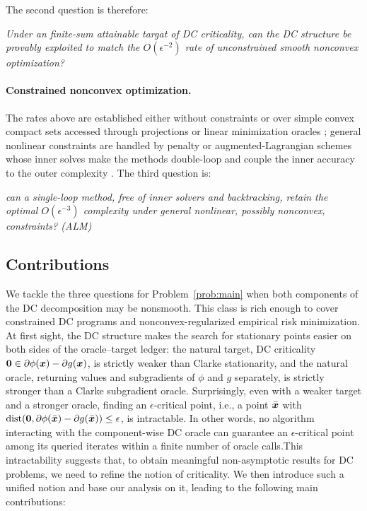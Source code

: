 The second question is therefore:

\emph{Under an finite-sum attainable targat of DC
criticality, can the DC structure be provably exploited to match the
$O(\epsilon^{-2})$ rate of unconstrained smooth nonconvex
optimization?}

\paragraph{Constrained nonconvex optimization.}
The rates above are established either without constraints or over
simple convex compact sets accessed through projections or linear
minimization oracles \citep{khamaru2018convergence,maskan2025}; general nonlinear
constraints are handled by penalty or augmented-Lagrangian schemes
whose inner solves make the methods double-loop and couple the inner
accuracy to the outer complexity
\citep{xie2021complexity,lu2022penalty,yu2021convergence,kanzow2025adaptive}. The third question is:

\emph{can a single-loop method, free of inner solvers and
backtracking, retain the optimal $O(\epsilon^{-3})$ complexity under general
nonlinear, possibly nonconvex, constraints? (ALM)}

\subsection{Contributions}
We tackle the three questions for Problem~\eqref{prob:main} when both components of the DC decomposition may be nonsmooth.  This class is rich enough to cover
constrained DC programs and nonconvex-regularized empirical risk
minimization. At first sight, the DC structure makes the search for
stationary points easier on both sides of the oracle--target ledger:
the natural target, DC criticality
$\bm{0}\in\partial\phi(\bm{x})-\partial g(\bm{x})$, is strictly weaker than
Clarke stationarity, and the natural oracle, returning values and
subgradients of $\phi$ and $g$ separately, is strictly stronger than
a Clarke subgradient oracle. Surprisingly, even with a weaker target
and a stronger oracle, finding an $\epsilon$-critical point, i.e., a
point $\bar{\bm{x}}$ with
$\operatorname{dist}(\bm{0},\partial\phi(\bar{\bm{x}})-\partial g(\bar{\bm{x}}))
\le\epsilon$, is intractable. In other words, no algorithm
interacting with the component-wise DC oracle can guarantee an
$\epsilon$-critical point among its queried iterates within a finite
number of oracle calls.This intractability suggests that, to obtain meaningful
non-asymptotic results for DC problems, we need to refine the notion
of criticality. We then introduce such a unified notion and base our analysis on
it, leading to the following main contributions:

